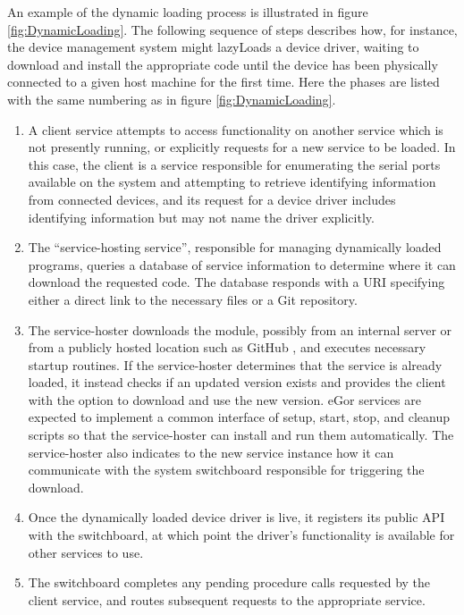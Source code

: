 \documentclass[../thesis]{subfiles}
\begin{document}
An example of the dynamic loading process is illustrated in figure
\ref{fig:DynamicLoading}. The following sequence of steps describes
how, for instance, the device management system might \glspl{lazyLoad} a
device driver, waiting to download and install the appropriate code
until the device has been physically connected to a given host machine
for the first time. Here the phases are listed with the same numbering
as in figure \ref{fig:DynamicLoading}.

\begin{enumerate}
  \item{
      A client service attempts to access functionality on another
      service which is not presently running, or explicitly requests for
      a new service to be loaded. In this case, the client is a service
      responsible for enumerating the serial ports available on the
      system and attempting to retrieve identifying information from
      connected devices, and its request for a device driver includes
      identifying information but may not name the driver explicitly.
  }
  \item{
      The ``service-hosting service'', responsible for managing
      dynamically loaded programs, queries a database of service
      information to determine where it can download the requested
      code. The database responds with a \gls{URI} specifying either a
      direct link to the necessary files or a Git repository.
  }
  \item{
      The service-hoster downloads the module, possibly from an
      internal server or from a publicly hosted location such as
      GitHub \cite{GitHub}, and executes necessary startup
      routines. If the service-hoster determines that the service is
      already loaded, it instead checks if an updated version exists
      and provides the client with the option to download and use the
      new version. eGor services are expected to implement a common
      interface of setup, start, stop, and cleanup scripts so that the
      service-hoster can install and run them automatically. The
      service-hoster also indicates to the new service instance how it
      can communicate with the system switchboard responsible for
      triggering the download.
  }
  \item{
      Once the dynamically loaded device driver is live, it registers its
      public \gls{API} with the switchboard, at which point the
      driver's functionality is available for other services to use.
  }
  \item{
      The switchboard completes any pending procedure calls requested
      by the client service, and routes subsequent requests to the
      appropriate service.
  }
\end{enumerate}
\end{document}
